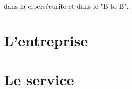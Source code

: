 \documentclass[a4paper, 11pt, french]{report}
\begin{document}
                                                                                                                                                                                                                                 dans
                                                                                                                                                                                                                                 la
                                                                                                                                                                                                                                 cibersécurité
                                                                                                                                                                                                                                 et
                                                                                                                                                                                                                                 dans
                                                                                                                                                                                                                                 le
                                                                                                                                                                                                                                 "B
                                                                                                                                                                                                                                 to
                                                                                                                                                                                                                                 B".
                                                                                                                                                                                                                                   \section{L'entreprise}
                                                                                                                                                                                                                                     \section{Le
                                                                                                                                                                                                                                     service}
\end{document}
